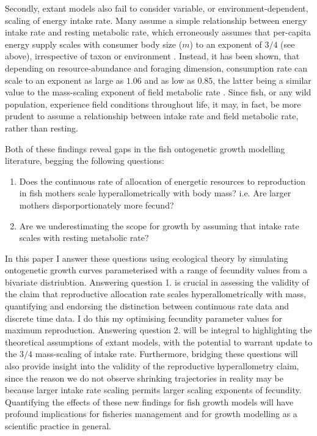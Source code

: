 \documentclass[a4paper]{article} %
\begin{document}
    Secondly, extant models also fail to consider variable, or environment-dependent, scaling of energy intake rate. Many assume a simple relationship between energy intake rate and resting metabolic rate, which erroneously assumes that per-capita energy supply scales with consumer body size ($m$) to an exponent of $3/4$ (see above), irrespective of taxon or environment \autocite{Pawar2012}. Instead, it has been shown, that depending on resource-abundance and foraging dimension, consumption rate can scale to an exponent as large as $1.06$ and as low as $0.85$, the latter being a similar value to the mass-scaling exponent of field metabolic rate \autocite{peters1983,Weibel2004, Pawar2012}. Since fish, or any wild population, experience field conditions throughout life, it may, in fact, be more prudent to assume a relationship between intake rate and field metabolic rate, rather than resting.
    
    Both of these findings reveal gaps in the fish ontogenetic growth modelling literature, begging the following questions:
    \begin{enumerate}
        \item Does the continuous rate of allocation of energetic resources to reproduction in fish mothers scale hyperallometrically with body mass? i.e. Are larger mothers disporportionately more fecund?
        \item Are we underestimating the scope for growth by assuming that intake rate scales with resting metabolic rate?
    \end{enumerate}
    In this paper I answer these questions using ecological theory by simulating ontogenetic growth curves parameterised with a range of fecundity values from a bivariate distriubtion. Answering question 1. is crucial in assessing the validity of the claim that reproductive allocation rate scales hyperallometrically with mass, quantifying and endorsing the distinction between continuous rate data and discrete time data. I do this my optimising fecundity parameter values for maximum reproduction. Answering question 2. will be integral to highlighting the theoretical assumptions of extant models, with the potential to warrant update to the $3/4$ mass-scaling of intake rate. Furthermore, bridging these questions will also provide insight into the validity of the reproductive hyperallometry claim, since the reason we do not observe shrinking trajectories in reality may be because larger intake rate scaling permits larger scaling exponents of fecundity. Quantifying the effects of these new findings for fish growth models will have profound implications for fisheries management and for growth modelling as a scientific practice in general.
\end{document}
